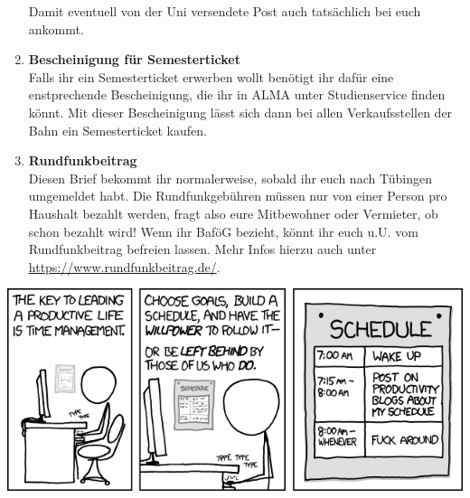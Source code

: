\begin{enumerate}[label=$\bigcirc$]
		Damit eventuell von der Uni versendete Post auch tatsächlich bei euch ankommt.
	\item \textbf{Bescheinigung für Semesterticket} \\	
		Falls ihr ein Semesterticket erwerben wollt benötigt ihr dafür eine enstprechende Bescheinigung, die ihr in ALMA unter Studienservice finden könnt. Mit dieser Bescheinigung lässt sich dann bei allen Verkaufsstellen der Bahn ein Semesterticket kaufen.
	\item \textbf{Rundfunkbeitrag} \\
		Diesen Brief bekommt ihr normalerweise, sobald ihr euch nach Tübingen umgemeldet habt. Die Rundfunkgebühren müssen nur von einer Person pro Haushalt bezahlt werden, fragt also eure Mitbewohner oder Vermieter, ob schon bezahlt wird! Wenn ihr BaföG bezieht, könnt ihr euch u.U. vom Rundfunkbeitrag befreien lassen. Mehr Infos hierzu auch unter \url{https://www.rundfunkbeitrag.de/}.
  \end{enumerate}

\begin{center}
\includegraphics[width=0.5\hsize]{info/xkcd/time_management.png}
\end{center}


